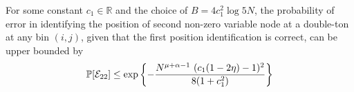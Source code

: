 %	

\begin{lemma}\label{Lem:Pos2}
For some constant $c_1 \in \mathbb{R}$ and the choice of $B=4c_1^2\log 5N$, the probability of error in identifying the position of second non-zero variable node at a double-ton at any bin $(i,j)$, given that the first position identification is correct, can be upper bounded by
	\begin{align*}
		\mathbb{P}[\mathcal{E}_{22}]\leq \exp\left\lbrace-\frac{N^{\mu+\alpha-1} ~ (c_1(1 - 2\eta) - 1)^2}{8(1+ c_1^2)}\right\rbrace
	\end{align*}
\end{lemma}

